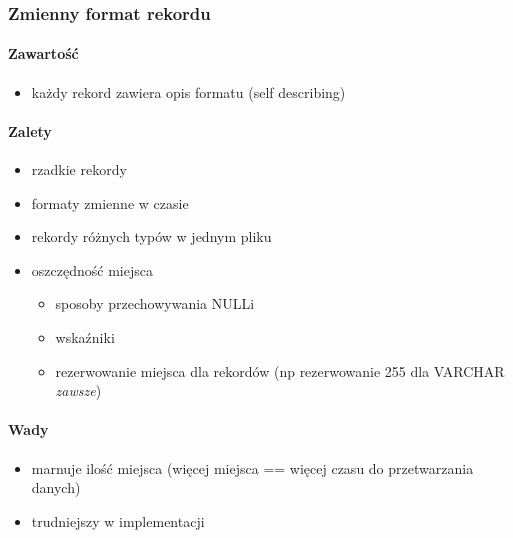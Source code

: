 \documentclass[12pt]{article}
\begin{document}
\subsubsection{Zmienny format rekordu}
\paragraph{Zawartość}
\begin{itemize}
\item każdy rekord zawiera opis formatu (self describing)
\end{itemize}
\paragraph{Zalety}
\begin{itemize}
\item rzadkie rekordy
\item formaty zmienne w czasie
\item rekordy różnych typów w jednym pliku
\item oszczędność miejsca
\begin{itemize}
\item sposoby przechowywania NULLi
\item wskaźniki
\item rezerwowanie miejsca dla rekordów (np rezerwowanie 255 dla VARCHAR \emph{zawsze})
\end{itemize}
\end{itemize}
\paragraph{Wady}
\begin{itemize}
\item marnuje ilość miejsca (więcej miejsca == więcej czasu do przetwarzania danych)
\item trudniejszy w implementacji
\end{itemize}
\end{document}
